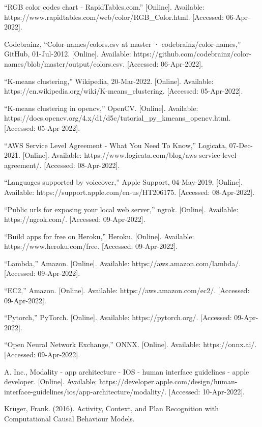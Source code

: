 \documentclass[a4paper,11pt]{article}
\begin{document}
\begin{thebibliography}{9}
“RGB color codes chart - RapidTables.com.” [Online]. Available: https://www.rapidtables.com/web/color/RGB\_Color.html. [Accessed: 06-Apr-2022]. 

Codebrainz, “Color-names/colors.csv at master · codebrainz/color-names,” GitHub, 01-Jul-2012. [Online]. Available: https://github.com/codebrainz/color-names/blob/master/output/colors.csv. [Accessed: 06-Apr-2022]. 

“K-means clustering,” Wikipedia, 20-Mar-2022. [Online]. Available: https://en.wikipedia.org/wiki/K-means\_clustering. [Accessed: 05-Apr-2022].

“K-means clustering in opencv,” OpenCV. [Online]. Available: https://docs.opencv.org/4.x/d1/d5c/tutorial\_py\_kmeans\_opencv.html. [Accessed: 05-Apr-2022]. 

“AWS Service Level Agreement - What You Need To Know,” Logicata, 07-Dec-2021. [Online]. Available: https://www.logicata.com/blog/aws-service-level-agreement/. [Accessed: 08-Apr-2022].

“Languages supported by voiceover,” Apple Support, 04-May-2019. [Online]. Available: https://support.apple.com/en-us/HT206175. [Accessed: 08-Apr-2022]. 

“Public urls for exposing your local web server,” ngrok. [Online]. Available: https://ngrok.com/. [Accessed: 09-Apr-2022]. 

“Build apps for free on Heroku,” Heroku. [Online]. Available: https://www.heroku.com/free. [Accessed: 09-Apr-2022].

“Lambda,” Amazon. [Online]. Available: https://aws.amazon.com/lambda/. [Accessed: 09-Apr-2022]. 

“EC2,” Amazon. [Online]. Available: https://aws.amazon.com/ec2/. [Accessed: 09-Apr-2022].

“Pytorch,” PyTorch. [Online]. Available: https://pytorch.org/. [Accessed: 09-Apr-2022]. 

“Open Neural Network Exchange,” ONNX. [Online]. Available: https://onnx.ai/. [Accessed: 09-Apr-2022]. 

A. Inc., Modality - app architecture - IOS - human interface guidelines - apple developer. [Online]. Available: https://developer.apple.com/design/human-interface-guidelines/ios/app-architecture/modality/. [Accessed: 10-Apr-2022]. 

Krüger, Frank. (2016). Activity, Context, and Plan Recognition with Computational Causal Behaviour Models.

\end{thebibliography}
\end{document}
